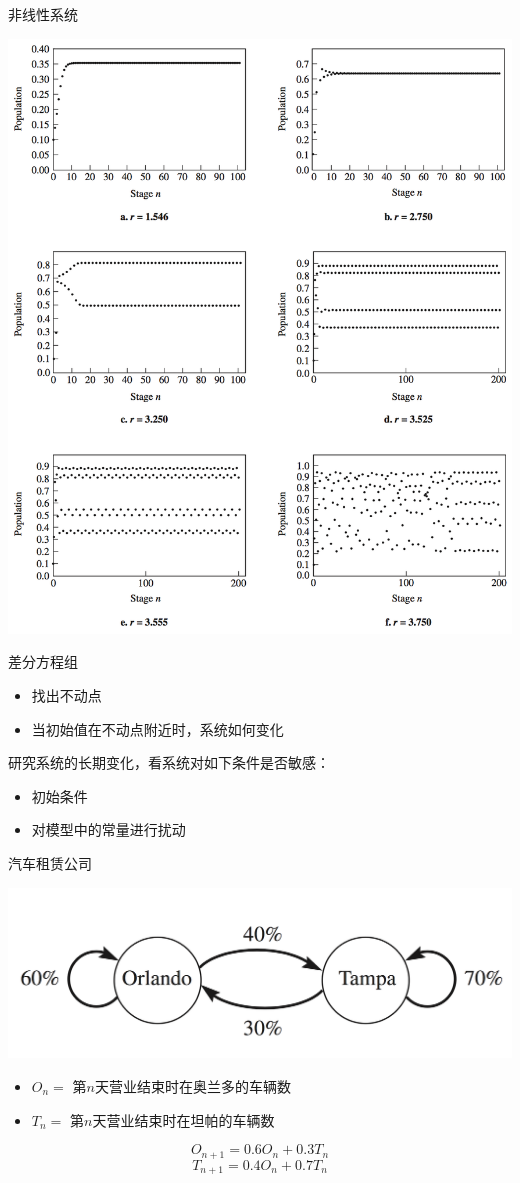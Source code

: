 \documentclass[UTF8]{ctexbeamer}
\begin{document}
\begin{frame}{非线性系统}
  \begin{center}
    \includegraphics[width=.5\textwidth{}]{nonlinear.png}\\
  \end{center}
  
\end{frame}

\begin{frame}{差分方程组}
  \begin{itemize}
  \item 找出不动点
  \item 当初始值在不动点附近时，系统如何变化
  \end{itemize}

研究系统的长期变化，看系统对如下条件是否敏感：
\begin{itemize}
\item 初始条件
\item 对模型中的常量进行扰动
\end{itemize}

\end{frame}

\begin{frame}{汽车租赁公司}
  \begin{center}
    \includegraphics[width=.5\textwidth{}]{taxi.png}
  \end{center}
  \begin{definition}
    \begin{itemize}
    \item $O_n =$ 第$n$天营业结束时在奥兰多的车辆数
    \item $T_n =$ 第$n$天营业结束时在坦帕的车辆数
    \end{itemize}
  \end{definition}
  \[
  O_{n+1}=0.6O_n + 0.3T_n
  \]
  \[
  T_{n+1}=0.4O_n + 0.7T_n
  \]
\end{frame}
\end{document}
